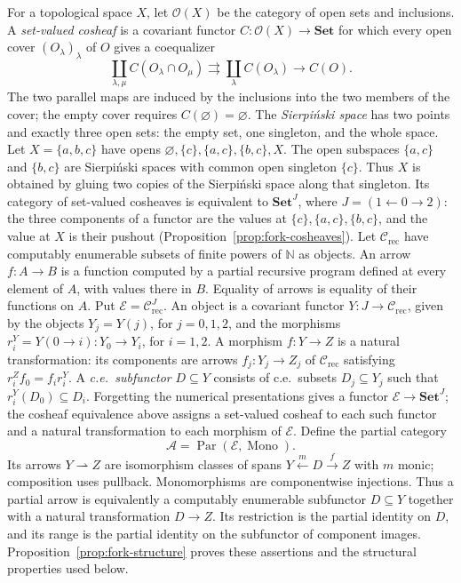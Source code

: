 \documentclass[11pt]{article}
\newcommand{\N}{\mathbb N}
\begin{document}
For a topological space $X$, let $\mathcal O(X)$ be the category
of open sets and inclusions. A \emph{set-valued cosheaf} is a
covariant functor $C:\mathcal O(X)\to\mathbf{Set}$ for which
every open cover $(O_\lambda)_\lambda$ of $O$ gives a coequalizer
\cite[Definition 2.6]{CurryCosheaves}
\[
 \coprod_{\lambda,\mu} C(O_\lambda\cap O_\mu)
 \rightrightarrows \coprod_\lambda C(O_\lambda)
 \longrightarrow C(O).
\]
The two parallel maps are induced by the inclusions into the two
members of the cover; the empty cover requires
$C(\varnothing)=\varnothing$.
The \emph{Sierpi\'nski space} has two points and exactly three open
sets: the empty set, one singleton, and the whole space.
Let $X=\{a,b,c\}$ have opens
$\varnothing,\{c\},\{a,c\},\{b,c\},X$.
The open subspaces $\{a,c\}$ and $\{b,c\}$ are Sierpi\'nski spaces
with common open singleton $\{c\}$. Thus $X$ is obtained by gluing
two copies of the Sierpi\'nski space along that singleton.
Its category of set-valued cosheaves is equivalent to
$\mathbf{Set}^{J}$, where $J=(1\leftarrow0\to2)$: the three
components of a functor are the values at
$\{c\},\{a,c\},\{b,c\}$, and the value at $X$ is their pushout
(Proposition~\ref{prop:fork-cosheaves}).
Let $\mathcal C_{\mathrm{rec}}$ have computably enumerable subsets
of finite powers of $\N$ as objects. An arrow $f:A\to B$ is a
function computed by a partial recursive program defined at every
element of $A$, with values there in $B$. Equality of arrows is
equality of their functions on $A$.
Put $\mathcal E=\mathcal C_{\mathrm{rec}}^J$.
An object is a covariant functor $Y:J\to\mathcal C_{\mathrm{rec}}$,
given by the objects $Y_j=Y(j)$, for $j=0,1,2$, and the
morphisms $r_i^Y=Y(0\to i):Y_0\to Y_i$, for $i=1,2$.
A morphism $f:Y\to Z$ is a natural transformation: its components
are arrows $f_j:Y_j\to Z_j$ of $\mathcal C_{\mathrm{rec}}$ satisfying
$r_i^Zf_0=f_i r_i^Y$.
A \emph{c.e.\ subfunctor} $D\subseteq Y$ consists of c.e.\ subsets
$D_j\subseteq Y_j$ such that $r_i^Y(D_0)\subseteq D_i$.
Forgetting the numerical presentations gives a functor
$\mathcal E\to\mathbf{Set}^J$; the cosheaf equivalence above assigns
a set-valued cosheaf to each such functor and a natural transformation
to each morphism of $\mathcal E$.
Define the partial category
\[
 \mathcal A=\operatorname{Par}(\mathcal E,\operatorname{Mono}).
\]
Its arrows $Y\rightharpoonup Z$ are isomorphism classes of spans
$Y\xleftarrow{m}D\xrightarrow{f}Z$ with $m$ monic; composition
uses pullback. Monomorphisms are componentwise injections.
Thus a partial arrow is equivalently a computably enumerable
subfunctor $D\subseteq Y$ together with a natural transformation
$D\to Z$. Its
restriction is the partial identity on $D$, and its range is the
partial identity on the subfunctor of component images.
Proposition~\ref{prop:fork-structure} proves these assertions and
the structural properties used below.
\end{document}
